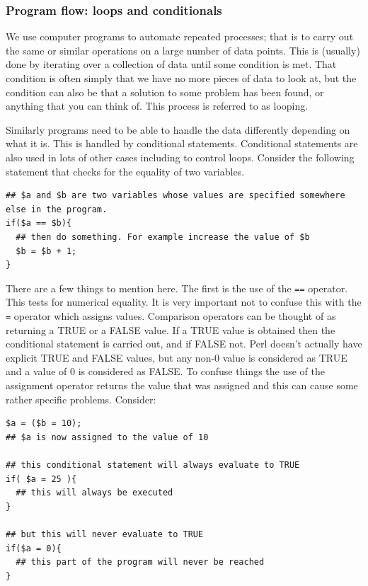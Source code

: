 \documentclass[11pt]{article}
\begin{document}
\subsubsection{Program flow: loops and conditionals}
\label{sec-9-0-4}

We use computer programs to automate repeated processes; that is to
carry out the same or similar operations on a large number of data
points. This is (usually) done by iterating over a collection of data
until some condition is met. That condition is often simply that we have
no more pieces of data to look at, but the condition can also be that a
solution to some problem has been found, or anything that you can think
of. This process is referred to as looping.

Similarly programs need to be able to handle the data differently
depending on what it is. This is handled by conditional statements.
Conditional statements are also used in lots of other cases including to
control loops. Consider the following statement that checks for the
equality of two variables.

\begin{verbatim}
## $a and $b are two variables whose values are specified somewhere else in the program.
if($a == $b){
  ## then do something. For example increase the value of $b
  $b = $b + 1;
}
\end{verbatim}

There are a few things to mention here. The first is the use of the \texttt{==}
operator. This tests for numerical equality. It is very important not to
confuse this with the \texttt{=} operator which assigns values. Comparison
operators can be thought of as returning a TRUE or a FALSE value. If a
TRUE value is obtained then the conditional statement is carried out,
and if FALSE not. Perl doesn't actually have explicit TRUE and FALSE
values, but any non-0 value is considered as TRUE and a value of 0 is
considered as FALSE. To confuse things the use of the assignment
operator returns the value that was assigned and this can cause some
rather specific problems. Consider:

\begin{verbatim}
$a = ($b = 10);
## $a is now assigned to the value of 10

## this conditional statement will always evaluate to TRUE
if( $a = 25 ){
  ## this will always be executed
}

## but this will never evaluate to TRUE
if($a = 0){
  ## this part of the program will never be reached
}
\end{verbatim}
\end{document}
